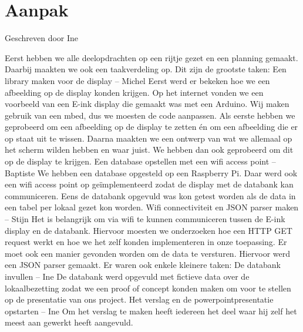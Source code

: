 \documentclass[a4paper,kul]{kulakarticle} %
\begin{document}
\section{Aanpak}
{\scriptsize Geschreven door Ine}
\newline

Eerst hebben we alle deelopdrachten op een rijtje gezet en een planning gemaakt. Daarbij maakten we ook een taakverdeling op. 
\newline
\newline
Dit zijn de grootste taken:
\newline
\newline
Een library maken voor de display – Michel
\newline
Eerst werd er bekeken hoe we een afbeelding op de display konden krijgen. Op het internet vonden we een voorbeeld van een E-ink display die gemaakt was met een Arduino. Wij maken gebruik van een mbed, dus we moesten de code aanpassen. 
Als eerste hebben we geprobeerd om een afbeelding op de display te zetten én om een afbeelding die er op staat uit te wissen.
Daarna maakten we een ontwerp van wat we allemaal op het scherm wilden hebben en waar juist. We hebben dan ook geprobeerd om dit op de display te krijgen.
\newline
\newline
Een database opstellen met een wifi access point – Baptiste
\newline
We hebben een database opgesteld op een Raspberry Pi. Daar werd ook een wifi access point op geïmplementeerd zodat de display met de databank kan communiceren.
Eens de databank opgevuld was kon getest worden als de data in een tabel per lokaal gezet kon worden.
\newline
\newline
Wifi connectiviteit en JSON parser maken – Stijn
\newline
Het is belangrijk om via wifi te kunnen communiceren tussen de E-ink display en de databank. Hiervoor moesten we onderzoeken hoe een HTTP GET request werkt en hoe we het zelf konden implementeren in onze toepassing.
\newline
Er moet ook een manier gevonden worden om de data te versturen. Hiervoor werd een JSON parser gemaakt.
\newline
\newline
Er waren ook enkele kleinere taken:
\newline
\newline
De databank invullen – Ine
\newline
De databank werd opgevuld met fictieve data over de lokaalbezetting zodat we een proof of concept konden maken om voor te stellen op de presentatie van ons project.
\newline
\newline
Het verslag en de powerpointpresentatie opstarten – Ine 
\newline
Om het verslag te maken heeft iedereen het deel waar hij zelf het meest aan gewerkt heeft aangevuld. 
\end{document}

